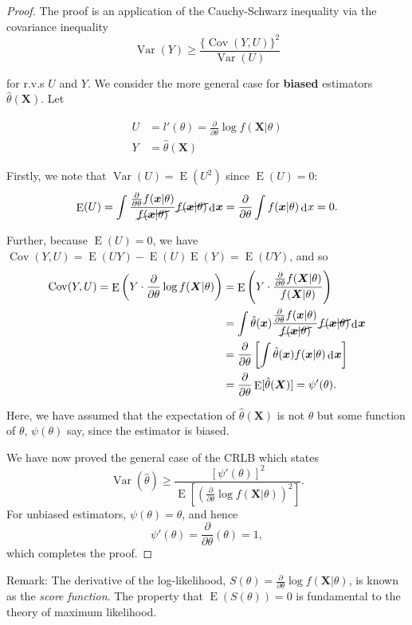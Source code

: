 \documentclass[
]{book}
\newcommand{\bx}{{\boldsymbol x}}
\newcommand{\bX}{{\boldsymbol X}}
\DeclareMathOperator{\E}{E}
\DeclareMathOperator{\Var}{Var}
\DeclareMathOperator{\Cov}{Cov}
\DeclareMathOperator{\dd}{d}
\newcommand{\dint}{\dd\hspace{0.5pt}\!}
\theoremstyle{definition}
\theoremstyle{definition}
\theoremstyle{definition}
\theoremstyle{definition}
\theoremstyle{remark}
\begin{document}
\begin{proof}
The proof is an application of the Cauchy-Schwarz inequality via the covariance inequality
\[
\Var(Y) \geq \frac{\{\Cov(Y,U)\}^2}{\Var(U)}
\]

for r.v.s \(U\) and \(Y\). We consider the more general case for \textbf{biased} estimators \(\hat\theta(\bX)\).
Let

\begin{align*}
U &= l'(\theta) = \frac{\partial}{\partial \theta} \log f(\bX|\theta) \\
Y &= \hat\theta(\bX)
\end{align*}

Firstly, we note that \(\Var(U)=\E(U^2)\) since \(\E(U)=0\):
\[
\E(U) = \int\frac{\frac{\partial}{\partial \theta} f(\bx|\theta)}{\cancel{f(\bx|\theta)}} \cancel{f(\bx|\theta)} \dint \bx = \frac{\partial}{\partial \theta} \int f(\bx|\theta) \dint x = 0.
\]

Further, because \(\E(U)=0\), we have \(\Cov(Y,U)=\E(UY)-\E(U)\E(Y) = \E(UY)\), and so
\begin{align*}
\Cov(Y,U) = \E \left(Y \cdot \frac{\partial}{\partial \theta} \log f(\bX|\theta) \right)
&= \E \left(Y \cdot \frac{\frac{\partial}{\partial \theta} f(\bX|\theta)}{f(\bX|\theta)} \right)\\
&= \int \hat\theta(\bx)  \frac{\frac{\partial}{\partial \theta} f(\bx|\theta)}{\cancel{f(\bx|\theta)}} \cancel{f(\bx|\theta)} \dint \bx \\
&= \frac{\partial}{\partial \theta} \left[ 
\int \hat\theta(\bx)  f(\bx|\theta) \dint \bx
\right] \\
&= \frac{\partial}{\partial \theta} \E[\hat\theta(\bX)] = \psi'(\theta).
\end{align*}

Here, we have assumed that the expectation of \(\hat\theta(\bX)\) is not \(\theta\) but some function of \(\theta\), \(\psi(\theta)\) say, since the estimator is biased.

We have now proved the general case of the CRLB which states
\[
\Var(\hat\theta) \geq \frac{\left[\psi'(\theta) \right]^2}{\E\left[\left(\frac{\partial}{\partial \theta} \log f(\bX|\theta) \right)^2\right]}.
\]
For unbiased estimators, \(\psi(\theta)=\theta\), and hence
\[
\psi'(\theta) = \frac{\partial}{\partial\theta}(\theta) = 1,
\]
which completes the proof.
\end{proof}

Remark: The derivative of the log-likelihood, \(S(\theta) = \frac{\partial}{\partial \theta} \log f(\bX|\theta)\), is known as the \emph{score function}. The property that \(\E(S(\theta))=0\) is fundamental to the theory of maximum likelihood.
\end{document}

